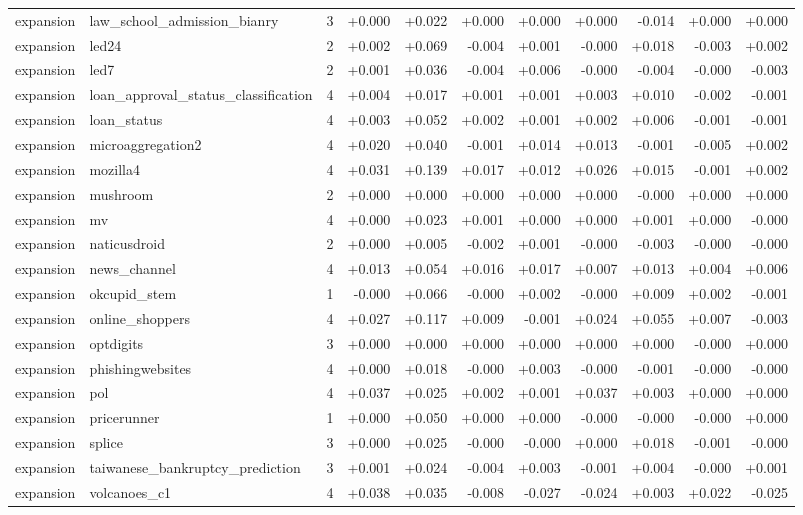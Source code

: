 \begin{table}[htbp]
\begin{adjustbox}{max width=\linewidth}
\begin{tabular}{llrrrrrrrrr}
expansion & law\_school\_admission\_bianry & 3 & +0.000 & +0.022 & +0.000 & +0.000 & +0.000 & -0.014 & +0.000 & +0.000 \\
expansion & led24 & 2 & +0.002 & +0.069 & -0.004 & +0.001 & -0.000 & +0.018 & -0.003 & +0.002 \\
expansion & led7 & 2 & +0.001 & +0.036 & -0.004 & +0.006 & -0.000 & -0.004 & -0.000 & -0.003 \\
expansion & loan\_approval\_status\_classification & 4 & +0.004 & +0.017 & +0.001 & +0.001 & +0.003 & +0.010 & -0.002 & -0.001 \\
expansion & loan\_status & 4 & +0.003 & +0.052 & +0.002 & +0.001 & +0.002 & +0.006 & -0.001 & -0.001 \\
expansion & microaggregation2 & 4 & +0.020 & +0.040 & -0.001 & +0.014 & +0.013 & -0.001 & -0.005 & +0.002 \\
expansion & mozilla4 & 4 & +0.031 & +0.139 & +0.017 & +0.012 & +0.026 & +0.015 & -0.001 & +0.002 \\
expansion & mushroom & 2 & +0.000 & +0.000 & +0.000 & +0.000 & +0.000 & -0.000 & +0.000 & +0.000 \\
expansion & mv & 4 & +0.000 & +0.023 & +0.001 & +0.000 & +0.000 & +0.001 & +0.000 & -0.000 \\
expansion & naticusdroid & 2 & +0.000 & +0.005 & -0.002 & +0.001 & -0.000 & -0.003 & -0.000 & -0.000 \\
expansion & news\_channel & 4 & +0.013 & +0.054 & +0.016 & +0.017 & +0.007 & +0.013 & +0.004 & +0.006 \\
expansion & okcupid\_stem & 1 & -0.000 & +0.066 & -0.000 & +0.002 & -0.000 & +0.009 & +0.002 & -0.001 \\
expansion & online\_shoppers & 4 & +0.027 & +0.117 & +0.009 & -0.001 & +0.024 & +0.055 & +0.007 & -0.003 \\
expansion & optdigits & 3 & +0.000 & +0.000 & +0.000 & +0.000 & +0.000 & +0.000 & -0.000 & +0.000 \\
expansion & phishingwebsites & 4 & +0.000 & +0.018 & -0.000 & +0.003 & -0.000 & -0.001 & -0.000 & -0.000 \\
expansion & pol & 4 & +0.037 & +0.025 & +0.002 & +0.001 & +0.037 & +0.003 & +0.000 & +0.000 \\
expansion & pricerunner & 1 & +0.000 & +0.050 & +0.000 & +0.000 & -0.000 & -0.000 & -0.000 & +0.000 \\
expansion & splice & 3 & +0.000 & +0.025 & -0.000 & -0.000 & +0.000 & +0.018 & -0.001 & -0.000 \\
expansion & taiwanese\_bankruptcy\_prediction & 3 & +0.001 & +0.024 & -0.004 & +0.003 & -0.001 & +0.004 & -0.000 & +0.001 \\
expansion & volcanoes\_c1 & 4 & +0.038 & +0.035 & -0.008 & -0.027 & -0.024 & +0.003 & +0.022 & -0.025 \\
\bottomrule
\end{tabular}
\end{adjustbox}
\end{table}

